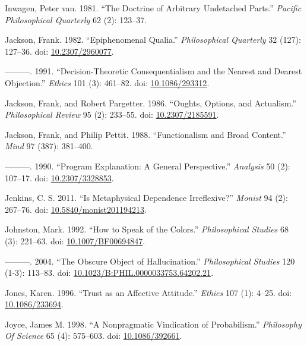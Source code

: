 \documentclass[
  10pt,
  letterpaper,
  DIV=11,
  numbers=noendperiod,
  twoside]{scrartcl}
\newlength{\cslhangindent}
\newenvironment{CSLReferences}[2] %
 {\begin{list}{}{%
  \setlength{\itemindent}{0pt}
  \setlength{\leftmargin}{0pt}
  \setlength{\parsep}{0pt}
  \ifodd #1
   \setlength{\leftmargin}{\cslhangindent}
   \setlength{\itemindent}{-1\cslhangindent}
  \fi
  \setlength{\itemsep}{#2\baselineskip}}}
 {\end{list}}
\begin{document}
\begin{CSLReferences}{1}{0}
Inwagen, Peter van. 1981. {``The Doctrine of Arbitrary Undetached
Parts.''} \emph{Pacific Philosophical Quarterly} 62 (2): 123--37.

Jackson, Frank. 1982. {``Epiphenomenal Qualia.''} \emph{Philosophical
Quarterly} 32 (127): 127--36. doi:
\href{https://doi.org/10.2307/2960077}{10.2307/2960077}.

---------. 1991. {``Decision-Theoretic Consequentialism and the Nearest
and Dearest Objection.''} \emph{Ethics} 101 (3): 461--82. doi:
\href{https://doi.org/10.1086/293312}{10.1086/293312}.

Jackson, Frank, and Robert Pargetter. 1986. {``Oughts, Options, and
Actualism.''} \emph{Philosophical Review} 95 (2): 233--55. doi:
\href{https://doi.org/10.2307/2185591}{10.2307/2185591}.

Jackson, Frank, and Philip Pettit. 1988. {``Functionalism and Broad
Content.''} \emph{Mind} 97 (387): 381--400.

---------. 1990. {``Program Explanation: A General Perspective.''}
\emph{Analysis} 50 (2): 107--17. doi:
\href{https://doi.org/10.2307/3328853}{10.2307/3328853}.

Jenkins, C. S. 2011. {``Is Metaphysical Dependence Irreflexive?''}
\emph{Monist} 94 (2): 267--76. doi:
\href{https://doi.org/10.5840/monist201194213}{10.5840/monist201194213}.

Johnston, Mark. 1992. {``How to Speak of the Colors.''}
\emph{Philosophical Studies} 68 (3): 221--63. doi:
\href{https://doi.org/10.1007/BF00694847}{10.1007/BF00694847}.

---------. 2004. {``The Obscure Object of Hallucination.''}
\emph{Philosophical Studies} 120 (1-3): 113--83. doi:
\href{https://doi.org/10.1023/B:PHIL.0000033753.64202.21}{10.1023/B:PHIL.0000033753.64202.21}.

Jones, Karen. 1996. {``Trust as an Affective Attitude.''} \emph{Ethics}
107 (1): 4--25. doi:
\href{https://doi.org/10.1086/233694}{10.1086/233694}.

Joyce, James M. 1998. {``A Nonpragmatic Vindication of Probabilism.''}
\emph{Philosophy Of Science} 65 (4): 575--603. doi:
\href{https://doi.org/10.1086/392661}{10.1086/392661}.


\end{CSLReferences}
\end{document}

